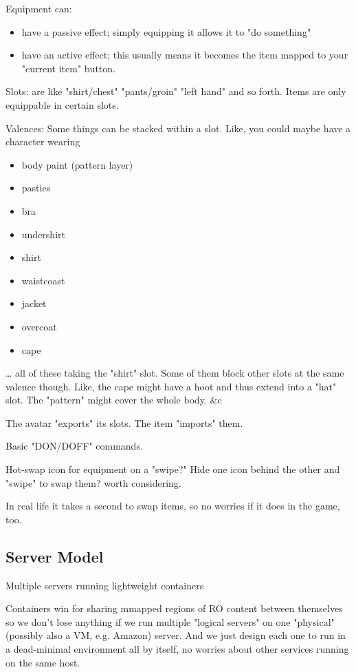 \documentclass[11pt]{article}
\begin{document}
Equipment can:

\begin{itemize}
\item have  a  passive effect;  simply  equipping  it  allows it  to  "do
something"

\item have  an active  effect; this  usually  means it  becomes the  item
mapped to your "current item" button.
\end{itemize}

Slots:  are  like  "shirt/chest"  "pants/groin"  "left  hand"  and  so
forth. Items are only equippable in certain slots.

Valences: Some  things can be stacked  within a slot. Like,  you could
maybe have a character wearing

\begin{itemize}
\item body paint (pattern layer)
\item pasties
\item bra
\item undershirt
\item shirt
\item waistcoast
\item jacket
\item overcoat
\item cape
\end{itemize}

… all of these taking the "shirt" slot. Some of them block other slots
at the same valence though. Like, the  cape might have a hoot and thus
extend into a "hat" slot. The "pattern" might cover the whole body. \&c

The avatar "exports" its slots. The item "imports" them.

Basic "DON/DOFF" commands.

Hot-swap icon  for equipment on  a "swipe?"  Hide one icon  behind the
other and "swipe" to swap them? worth considering.

In real life it takes a second to swap items, so no worries if it does
in the game, too.
\subsection{Server Model}
\label{sec-1-8}

Multiple servers running lightweight containers

Containers  win for  sharing  mmapped regions  of  RO content  between
themselves  so we  don't lose  anything  if we  run multiple  "logical
servers"  on  one  "physical"  (possibly   also  a  VM,  e.g.  Amazon)
server.  And  we  just  design  each one  to  run  in  a  dead-minimal
environment all by itself, no  worries about other services running on
the same host.
\end{document}
